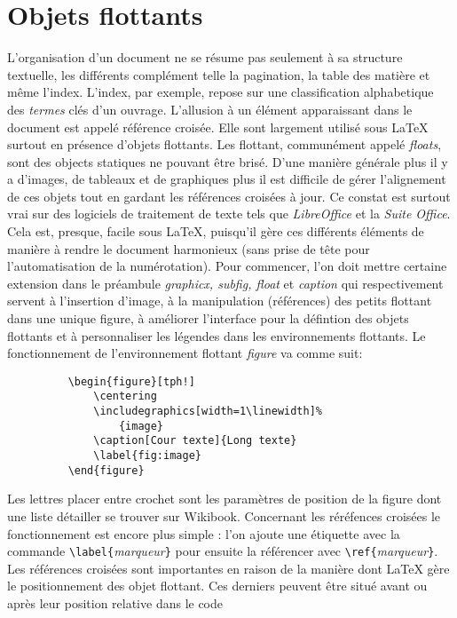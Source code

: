\section{Objets flottants}
L'organisation d'un document ne se résume pas seulement à sa structure textuelle, les différents complément telle la pagination, la table des matière et même l'index. L'index, par exemple, repose sur une classification alphabetique des \textit{termes}\footnotemark{} clés d'un ouvrage. L'allusion à un élément apparaissant dans le document est appelé référence croisée. Elle sont largement utilisé sous \LaTeX{} surtout en présence d'objets flottants. Les flottant, communément appelé \textit{floats}, sont des objects statiques ne pouvant être \og brisé\fg{}. D'une manière générale plus il y a d'images, de tableaux et de graphiques plus il est difficile de gérer l'alignement de ces objets tout en gardant les références croisées à jour.
Ce constat est surtout vrai sur des logiciels de traitement de texte tels que \textit{LibreOffice} et la \textit{Suite Office}. Cela est, presque, facile sous \LaTeX, puisqu'il gère ces différents éléments de manière à rendre le document harmonieux (sans prise de tête pour l'automatisation de la numérotation). Pour commencer, l'on doit mettre certaine extension dans le préambule \textit{graphicx, subfig, float} et \textit{caption} qui respectivement servent à l'insertion d'image, à la manipulation (références) des \og petits \fg{} flottant dans une unique figure, à améliorer l'interface pour la défintion des objets flottants et à personnaliser les légendes dans les environnements flottants. Le fonctionnement de l'environnement flottant \textit{figure} va comme suit:
\begin{figure}[tph!]
	\begin{verbatim}
	\begin{figure}[tph!]
	    \centering
	    \includegraphics[width=1\linewidth]%
	        {image}
	    \caption[Cour texte]{Long texte}
	    \label{fig:image}
	\end{figure}
	\end{verbatim}
\end{figure}
%
Les lettres placer entre crochet sont les paramètres de position de la figure dont une liste détailler se trouver sur Wikibook\footnotemark {}. Concernant les réréfences croisées le fonctionnement est encore plus simple : l'on ajoute une étiquette avec la commande \verb|\label{|\textit{marqueur}\verb|}| pour ensuite la référencer avec \verb|\ref{|\textit{marqueur}\verb|}|. Les références croisées sont importantes en raison de la manière dont \LaTeX{} gère le positionnement des objet flottant. Ces derniers peuvent être situé avant ou après leur position relative dans le code
